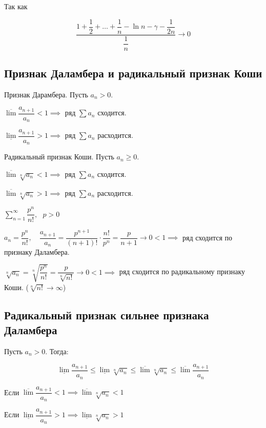 Так как 

$$ \dfrac{1 + \dfrac{1}{2} + \dots + \dfrac{1}{n} - \ln n - \gamma - \dfrac{1}{2n}}{\dfrac{1}{n}} \to 0 $$

\subsection{Признак Даламбера и радикальный признак Коши}

\begin{theorem}
Признак Дарамбера. Пусть $a_n > 0$.

$\overline{\lim} \dfrac{a_{n+1}}{a_n} < 1 \implies $ ряд $\sum a_n$ сходится.

$\underline{\lim} \dfrac{a_{n+1}}{a_n} > 1 \implies $ ряд $\sum a_n$ расходится.
\end{theorem}

\begin{theorem}
Радикальный признак Коши. Пусть $a_n \geq 0$.

 $\overline{\lim} \sqrt[n]{a_n} < 1 \implies$ ряд $\sum a_n$ сходится.
 
  $\overline{\lim} \sqrt[n]{a_n} > 1 \implies$ ряд $\sum a_n$ расходится.
\end{theorem}

\begin{example}
$\sum_{n=1}^{\infty} \dfrac{p^{n}}{n!}, \ \ \ p > 0$

$a_n = \dfrac{p^n}{n!},\quad \dfrac{a_{n+1}}{a_n} = \dfrac{p^{n+1}}{(n+1)!} \cdot \dfrac{n!}{p^n} = \dfrac{p}{n + 1} \to 0 < 1 \implies $ ряд сходится по признаку Даламбера.

$\sqrt[n]{a_n} = \sqrt[n]{\dfrac{p^n}{n!}} = \dfrac{p}{\sqrt[n]{n!}} \to 0 < 1 \implies$ ряд сходится по радикальному признаку Коши. ($ \sqrt[n]{n!} \to \infty$)
\end{example}

\subsection{Радикальный признак сильнее признака Даламбера}

Пусть $a_n > 0$. Тогда:

$$ \underline{\lim} \dfrac{a_{n+1}}{a_n} \leq \underline{\lim}{\sqrt[n]{a_n}} \leq \overline{\lim}{\sqrt[n]{a_n}} \leq \overline{\lim}\dfrac{a_{n+1}}{a_n}$$

Если $\overline{\lim}\dfrac{a_{n+1}}{a_n} < 1 \implies \overline{\lim}{\sqrt[n]{a_n}} < 1$

Если $\underline{\lim}\dfrac{a_{n+1}}{a_n} > 1 \implies \underline{\lim} \sqrt[n]{a_n} > 1$

